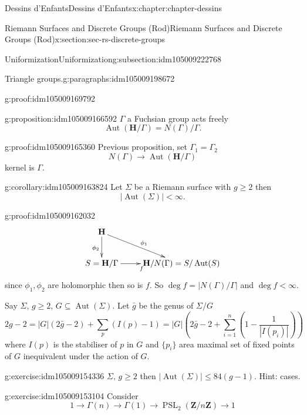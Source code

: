 \documentclass[oneside,10pt,]{book}
\numberwithin{equation}{section}
\newcommand{\ZZ}{\mathbf{Z}}
\newcommand{\HH}{\mathbf{H}}
\DeclareMathOperator{\Aut}{Aut}
\DeclareMathOperator{\PSL}{PSL}
\newcommand{\lt}{<}
\begin{document}
\begin{chapterptx}{Dessins d'Enfants}{}{Dessins d'Enfants}{}{}{x:chapter:chapter-dessins}
\begin{sectionptx}{Riemann Surfaces and Discrete Groups (Rod)}{}{Riemann Surfaces and Discrete Groups (Rod)}{}{}{x:section:sec-rs-discrete-groups}
\begin{subsectionptx}{Uniformization}{}{Uniformization}{}{}{g:subsection:idm105009222768}
\begin{paragraphs}{Triangle groups.}{g:paragraphs:idm105009198672}
\begin{proofptx}{}{g:proof:idm105009169792}
\end{proofptx}
\begin{proposition}{}{}{g:proposition:idm105009166592}%
\(\Gamma\) a Fuchsian group acts freely%
\begin{equation*}
\Aut(\HH/\Gamma) = N(\Gamma)/\Gamma\text{.}
\end{equation*}
%
\end{proposition}
\begin{proofptx}{}{g:proof:idm105009165360}
Previous proposition, set \(\Gamma_1 = \Gamma_2\)%
\begin{equation*}
N(\Gamma) \to \Aut(\HH/\Gamma)
\end{equation*}
kernel is \(\Gamma\).%
\end{proofptx}
\begin{corollary}{}{}{g:corollary:idm105009163824}%
Let \(\Sigma\) be a Riemann surface with \(g \ge 2\) then%
\begin{equation*}
|\Aut(\Sigma)| \lt \infty\text{.}
\end{equation*}
%
\end{corollary}
\begin{proofptx}{}{g:proof:idm105009162032}
%
\begin{equation*}
\xymatrix{
\HH \ar[dr]^{\phi_1} \ar[d]_{\phi_2}\\
S =\HH/\Gamma \ar[r]_f & \HH/N(\Gamma) = S/\Aut(S)
}
\end{equation*}
since \(\phi_1,\phi_2\) are holomorphic then so is \(f\). So \(\deg f=  | N(\Gamma) /\Gamma|\) and \(\deg f  \lt \infty\).%
\end{proofptx}
Say \(\Sigma\), \(g\ge 2\), \(G\subseteq \Aut(\Sigma)\). Let \(\bar g\) be the genus of \(\Sigma /G\)%
\begin{equation*}
2g - 2 = |G| (2\bar g - 2) + \sum_p (I(p) - 1) = |G|(2\bar g - 2 + \sum_{i=1}^n (1 - \frac{1}{|I(p_i)|}))
\end{equation*}
where \(I(p)\) is the stabiliser of \(p\) in \(G\) and \(\{p_i\}\) area maximal set of fixed points of \(G\) inequivalent under the action of \(G\).%
\begin{inlineexercise}{}{g:exercise:idm105009154336}%
\(\Sigma,\,g\ge 2\) then \(|\Aut(\Sigma)| \le 84(g-1)\). Hint: cases.%
\end{inlineexercise}
\begin{inlineexercise}{}{g:exercise:idm105009153104}%
Consider%
\begin{equation*}
1 \to \Gamma(n) \to \Gamma(1) \to \PSL_2(\ZZ/n\ZZ) \to 1
\end{equation*}

\end{inlineexercise}
\end{paragraphs}
\end{subsectionptx}
\end{sectionptx}
\end{chapterptx}
\end{document}

